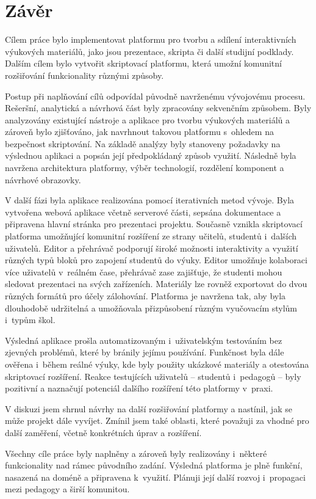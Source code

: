 \chapter*{Závěr}


Cílem práce bylo implementovat platformu pro tvorbu a sdílení interaktivních výukových materiálů, jako jsou prezentace, skripta či další studijní podklady. 
Dalším cílem bylo vytvořit skriptovací platformu, která umožní komunitní rozšiřování funkcionality různými způsoby.

Postup při naplňování cílů odpovídal původně navrženému vývojovému procesu. Rešeršní, analytická a návrhová část byly zpracovány sekvenčním způsobem. 
Byly analyzovány existující nástroje a aplikace pro tvorbu výukových materiálů a zároveň bylo zjišťováno, jak navrhnout takovou platformu s~ohledem na bezpečnost skriptování.
Na základě analýzy byly stanoveny požadavky na výslednou aplikaci a popsán její předpokládaný způsob využití. 
Následně byla navržena architektura platformy, výběr technologií, rozdělení komponent a návrhové obrazovky.

V další fázi byla aplikace realizována pomocí iterativních metod vývoje.
Byla vytvořena webová aplikace včetně serverové části, sepsána dokumentace a připravena hlavní stránka pro prezentaci projektu.
Současně vznikla skriptovací platforma umožňující komunitní rozšíření ze strany učitelů, studentů i~dalších uživatelů.
Editor a přehrávač podporují široké možnosti interaktivity a využití různých typů bloků pro zapojení studentů do výuky. 
Editor umožňuje kolaboraci více uživatelů v~reálném čase, přehrávač zase zajišťuje, že studenti mohou sledovat prezentaci na svých zařízeních.
Materiály lze rovněž exportovat do dvou různých formátů pro účely zálohování. Platforma je navržena tak, aby byla dlouhodobě udržitelná a umožňovala přizpůsobení různým vyučovacím stylům i~typům škol.

Výsledná aplikace prošla automatizovaným i~uživatelským testováním bez zjevných problémů, které by bránily jejímu používání. 
Funkčnost byla dále ověřena i~během reálné výuky, kde byly použity ukázkové materiály a otestována skriptovací rozšíření. 
Reakce testujících uživatelů -- studentů i~pedagogů -- byly pozitivní a naznačují potenciál dalšího rozšíření této platformy v~praxi.

V diskuzi jsem shrnul návrhy na další rozšiřování platformy a nastínil, jak se může projekt dále vyvíjet. 
Zmínil jsem také oblasti, které považuji za vhodné pro další zaměření, včetně konkrétních úprav a rozšíření. 

Všechny cíle práce byly naplněny a zároveň byly realizovány i~některé funkcionality nad rámec původního zadání. 
Výsledná platforma je plně funkční, nasazená na doméně a připravena k~využití. 
Plánuji její další rozvoj i~propagaci mezi pedagogy a širší komunitou.
